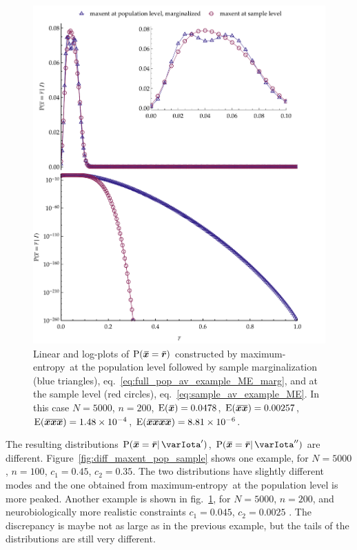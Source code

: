 \documentclass{article}
\theoremstyle{remark}
\theoremstyle{innote}
\newcommand*{\citep}{\parencites}
\renewcommand*{\cite}{\citep}
\renewcommand*{\|}{\mathpunct{|}}%
\newcommand*{\p}{\mathrm{P}}%
\newcommand*{\eqn}{eq.}%
\newcommand*{\fig}{fig.}%
\newcommand*{\E}{\mathrm{E}}
\DeclarePairedDelimiter\expp{(}{)}
\newcommand*{\expe}{\E\expp}%
\theoremstyle{simple}
\newcommand*{\widebar}[1]{{\mkern1.5mu\skew{2}\overline{\mkern-1.5mu#1\mkern-1.5mu}\mkern 1.5mu}}
\newcommand*{\sav}{\widebar} %
\newcommand*{\yxx}{x}%
\newcommand*{\yx}{\bm{\yxx}}%
\newcommand*{\yxs}{\sav{\yx}}%
\newcommand*{\yxxs}{\sav{\yx\yx}}%
\newcommand*{\yr}{\bm{r}}%
\newcommand*{\yrs}{\sav{\yr}}%
\newcommand*{\yHa}{\varIota'}
\newcommand*{\yHb}{\varIota''}
\newcommand*{\me}{maximum-entropy}
\begin{document}
\begin{figure}[!t]
\centering
\includegraphics[width=0.99\linewidth]{different_maxent_pop_sample_200_realdata_4mom.pdf}
% 
\caption{Linear and log-plots of $\p(\yxs = \yrs)$ constructed by \me\ at
  the population level followed by sample marginalization (blue triangles),
  \eqn~\eqref{eq:full_pop_av_example_ME_marg}, and at the sample level (red
  circles), \eqn~\eqref{eq:sample_av_example_ME}. In this case $N=5000$,
  $n=200$, $\expe{\yxs}=0.0478$, $\expe{\yxxs}=0.00257$,
  $\expe{\sav{\yx\yx\yx}}=1.48\times10^{-4}$,
  $\expe{\sav{\yx\yx\yx\yx}}=8.81\times 10^{-6}$.}
\label{fig:diff_maxent_pop_sample_realdata}
\end{figure}%

The resulting distributions $\p(\yxs = \yrs \| \yHa)$,
$\p(\yxs = \yrs \| \yHb)$ are different.
Figure~\ref{fig:diff_maxent_pop_sample} shows one example, for $N=5000$,
$n=100$, $c_1=0.45$, $c_2=0.35$. The two distributions have slightly
different modes and the one obtained from \me\ at the population level is
more peaked. Another example is shown in
\fig~\ref{fig:diff_maxent_pop_sample_realdata}, for $N=5000$, $n=200$,
and neurobiologically more realistic constraints $c_1=0.045$, $c_2=0.0025$
\cite{rostamietal2016}. The discrepancy is maybe not as large as in the
previous example, but the tails of the distributions are still very
different.
\end{document}
